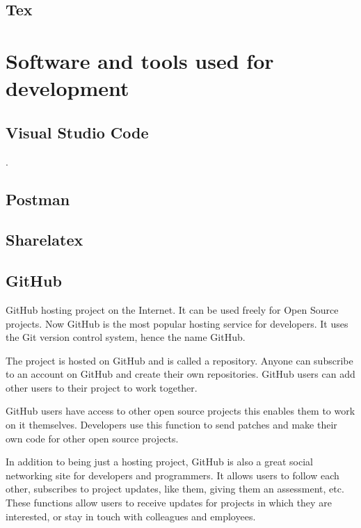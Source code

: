 \subsection{Tex}

\section{Software and tools used for development}

\subsection{Visual Studio Code}
\cite{VSCode}.

\subsection{Postman}

\subsection{Sharelatex}

\subsection{GitHub}
GitHub hosting project on the Internet. It can be used freely for Open Source projects. Now GitHub is the most popular hosting service for developers. It uses the Git version control system, hence the name GitHub.\par

The project is hosted on GitHub and is called a repository. Anyone can subscribe to an account on GitHub and create their own repositories. GitHub users can add other users to their project to work together.\par

GitHub users have access to other open source projects this enables them to work on it themselves. Developers use this function to send patches and make their own code for other open source projects.\par 

In addition to being just a hosting project, GitHub is also a great social networking site for developers and programmers. It allows users to follow each other, subscribes to project updates, like them, giving them an assessment, etc. These functions allow users to receive updates for projects in which they are interested, or stay in touch with colleagues and employees.\par

